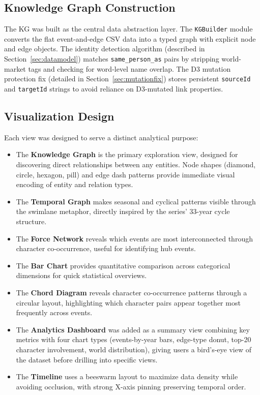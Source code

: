 \documentclass[11pt,a4paper]{article}
\begin{document}
\subsection{Knowledge Graph Construction}
The KG was built as the central data abstraction layer. The \texttt{KGBuilder} module converts the flat event-and-edge CSV data into a typed graph with explicit node and edge objects. The identity detection algorithm (described in Section~\ref{sec:datamodel}) matches \texttt{same\_person\_as} pairs by stripping world-market tags and checking for word-level name overlap. The D3 mutation protection fix (detailed in Section~\ref{sec:mutationfix}) stores persistent \texttt{sourceId} and \texttt{targetId} strings to avoid reliance on D3-mutated link properties.

\subsection{Visualization Design}
Each view was designed to serve a distinct analytical purpose:
\begin{itemize}[nosep]
    \item The \textbf{Knowledge Graph} is the primary exploration view, designed for discovering direct relationships between any entities. Node shapes (diamond, circle, hexagon, pill) and edge dash patterns provide immediate visual encoding of entity and relation types.
    \item The \textbf{Temporal Graph} makes seasonal and cyclical patterns visible through the swimlane metaphor, directly inspired by the series' 33-year cycle structure.
    \item The \textbf{Force Network} reveals which events are most interconnected through character co-occurrence, useful for identifying hub events.
    \item The \textbf{Bar Chart} provides quantitative comparison across categorical dimensions for quick statistical overviews.
    \item The \textbf{Chord Diagram} reveals character co-occurrence patterns through a circular layout, highlighting which character pairs appear together most frequently across events.
    \item The \textbf{Analytics Dashboard} was added as a summary view combining key metrics with four chart types (events-by-year bars, edge-type donut, top-20 character involvement, world distribution), giving users a bird's-eye view of the dataset before drilling into specific views.
    \item The \textbf{Timeline} uses a beeswarm layout to maximize data density while avoiding occlusion, with strong X-axis pinning preserving temporal order.
\end{itemize}
\end{document}
